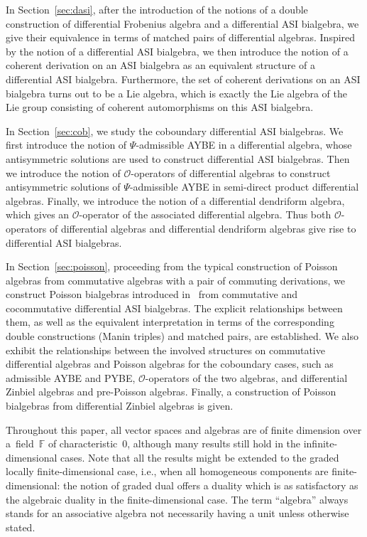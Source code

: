 \documentclass[10pt,a4paper]{amsart}
\numberwithin{equation}{section}
\begin{document}
In Section~\ref{sec:dasi}, after the introduction of the notions
of a double construction of differential Frobenius algebra and a
differential ASI bialgebra, we give their equivalence in terms of
matched pairs of differential algebras. Inspired by the notion of
a differential ASI bialgebra, we then introduce the notion of a
coherent derivation on an ASI bialgebra as an equivalent structure
of a differential ASI bialgebra. Furthermore, the set of coherent
derivations on an ASI bialgebra turns out to be a Lie algebra,
which is exactly the Lie algebra of the Lie group consisting of
coherent automorphisms on this ASI bialgebra.

In Section~\ref{sec:cob}, we study the coboundary differential ASI bialgebras.
We first introduce the notion of $\Psi$-admissible AYBE in a differential algebra,
whose antisymmetric solutions are used to construct differential ASI bialgebras.
Then we introduce the notion of $\mathcal{O}$-operators of differential algebras to construct antisymmetric solutions of $\Psi$-admissible AYBE in semi-direct product differential algebras.
Finally, we introduce the notion of a differential dendriform
algebra, which gives an $\mathcal{O}$-operator of the
associated differential algebra. Thus both $\mathcal O$-operators
of differential algebras and differential dendriform algebras give rise to
differential ASI bialgebras.

In Section~\ref{sec:poisson}, proceeding from the typical
construction of Poisson algebras from commutative algebras with a
pair of commuting derivations, we construct Poisson bialgebras
introduced in~\cite{ni2013poisson} from commutative and
cocommutative differential ASI bialgebras.
The explicit relationships between them, as well as the equivalent
interpretation in terms of the corresponding double constructions
(Manin triples) and matched pairs, are established. We also
exhibit the relationships between the involved structures on
commutative differential algebras and Poisson algebras for the
coboundary cases, such as admissible AYBE and PYBE,
$\mathcal{O}$-operators of the two algebras, and differential
Zinbiel algebras and pre-Poisson algebras.
Finally, a construction of Poisson bialgebras from differential Zinbiel algebras is given.

Throughout this paper, all vector spaces and algebras are of finite dimension over a~field~$\mathbb{F}$ of characteristic~$0$, although many results still hold in the infinite-dimensional cases.
Note that all the results might be extended to the graded locally finite-dimensional case, i.e., when all homogeneous components are finite-dimensional: the notion of graded dual offers a duality which is as satisfactory as the algebraic duality in the finite-dimensional case.
The term ``algebra'' always stands for an associative algebra not necessarily having a unit unless otherwise stated.
\end{document}
